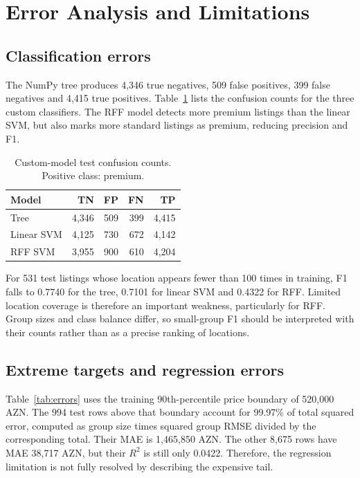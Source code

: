 \documentclass[10pt,twocolumn,a4paper]{article}
\begin{document}
\section{Error Analysis and Limitations}
\subsection{Classification errors}
The NumPy tree produces 4,346 true negatives, 509 false positives, 399 false negatives and 4,415 true positives. Table~\ref{tab:confusion} lists the confusion counts for the three custom classifiers. The RFF model detects more premium listings than the linear SVM, but also marks more standard listings as premium, reducing precision and F1.

\begin{table}[t]\centering\small
\caption{Custom-model test confusion counts. Positive class: premium.}\label{tab:confusion}
\begin{tabular}{@{}lrrrr@{}}\toprule
Model & TN & FP & FN & TP\\\midrule
Tree & 4,346 & 509 & 399 & 4,415\\
Linear SVM & 4,125 & 730 & 672 & 4,142\\
RFF SVM & 3,955 & 900 & 610 & 4,204\\\bottomrule
\end{tabular}
\end{table}

For 531 test listings whose location appears fewer than 100 times in training, F1 falls to 0.7740 for the tree, 0.7101 for linear SVM and 0.4322 for RFF. Limited location coverage is therefore an important weakness, particularly for RFF. Group sizes and class balance differ, so small-group F1 should be interpreted with their counts rather than as a precise ranking of locations.

\subsection{Extreme targets and regression errors}
Table~\ref{tab:errors} uses the training 90th-percentile price boundary of 520,000 AZN. The 994 test rows above that boundary account for 99.97\% of total squared error, computed as group size times squared group RMSE divided by the corresponding total. Their MAE is 1,465,850 AZN. The other 8,675 rows have MAE 38,717 AZN, but their $R^2$ is still only 0.0422. Therefore, the regression limitation is not fully resolved by describing the expensive tail.
\end{document}
